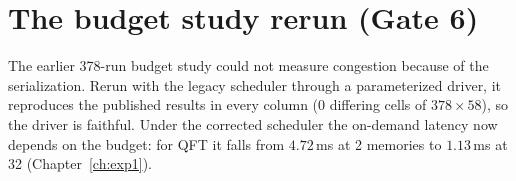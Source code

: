 \section{The budget study rerun (Gate 6)}
The earlier 378-run budget study could not measure congestion because of the serialization. Rerun with the legacy scheduler through a
parameterized driver, it reproduces the published results in every column (0 differing cells of $378\times58$), so the driver is faithful. Under
the corrected scheduler the on-demand latency now depends on the budget: for QFT it falls from $4.72$\,ms at 2 memories to $1.13$\,ms at 32
(Chapter~\ref{ch:exp1}).
